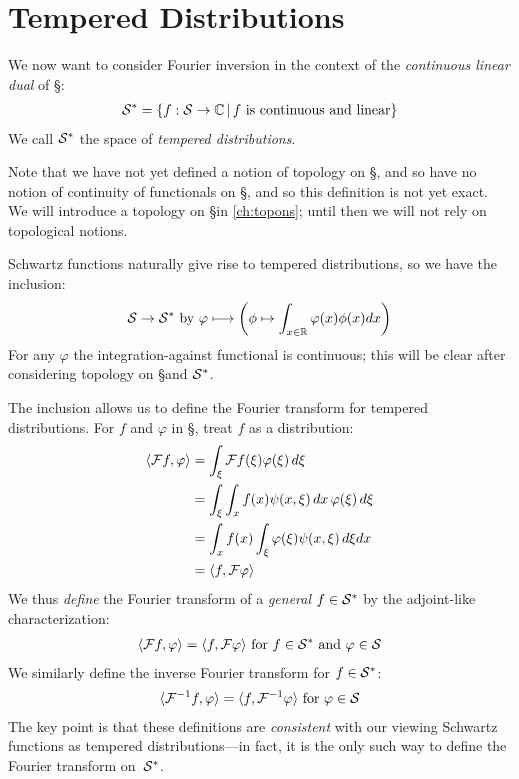     \section{Tempered Distributions}
      \label{sec:tempdist}
      We now want to consider Fourier inversion in the context of the \emph{continuous linear dual} of \S:
      \begin{align*}
        \S^* = \{f:\S\rightarrow\C\,\vert\,f\text{ is continuous and linear}\}
      \end{align*}
      We call $\S^*$ the space of \emph{tempered distributions}.

      Note that we have not yet defined a notion of topology on \S, and so have no notion of continuity of functionals on \S, and so this definition is not yet exact.
      We will introduce a topology on \S in \cref{ch:topons}; until then we will not rely on topological notions.

      Schwartz functions naturally give rise to tempered distributions, so we have the inclusion:
      \begin{align*}
        \S\rightarrow\S^*\text{ by }\varphi \longmapsto\left(\phi\mapsto\int_{x\in\R}\varphi(x)\phi(x)dx\right)
      \end{align*}
      For any $\varphi$ the integration-against functional is continuous; this will be clear after considering topology on \S and $\S^*$.
      
      The inclusion allows us to define the Fourier transform for tempered distributions.
      For $f$ and $\varphi$ in \S, treat $f$ as a distribution:
      \begin{align*}
        \langle\F f,\varphi\rangle &= \int_\xi\F f(\xi)\varphi(\xi)\,d\xi\\
        &= \int_\xi\int_xf(x)\psi(x,\xi)\,dx\,\varphi(\xi)\,d\xi\\
        &= \int_xf(x)\int_\xi\varphi(\xi)\psi(x,\xi)\,d\xi dx\\
        &= \langle f,\F\varphi\rangle
      \end{align*}
      We thus \emph{define} the Fourier transform of a \emph{general} $f\in\S^*$ by the adjoint-like characterization:
      \begin{align*}
        \langle\F f,\varphi\rangle = \langle f,\F\varphi\rangle \text{ for }f\in\S^*\text{ and }\varphi\in\S
      \end{align*}
      We similarly define the inverse Fourier transform for $f\in\S^*$:
      \begin{align*}
        \langle\F^{-1}f,\varphi\rangle = \langle f,\F^{-1}\varphi\rangle\text{ for }\varphi\in\S
      \end{align*}
      The key point is that these definitions are \emph{consistent} with our viewing Schwartz functions as tempered distributions---in fact, it is the only such way to define the Fourier transform on~$\S^*$.

